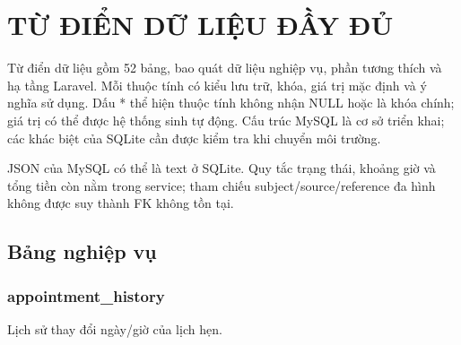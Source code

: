 \appendix\chapter{TỪ ĐIỂN DỮ LIỆU ĐẦY ĐỦ}\label{app:dictionary}
Từ điển dữ liệu gồm 52 bảng, bao quát dữ liệu nghiệp vụ, phần tương thích và hạ tầng Laravel.\allowbreak{} Mỗi thuộc tính có kiểu lưu trữ, khóa, giá trị mặc định và ý nghĩa sử dụng.\allowbreak{} Dấu * thể hiện thuộc tính không nhận NULL hoặc là khóa chính; giá trị có thể được hệ thống sinh tự động.\allowbreak{} Cấu trúc My\allowbreak{}SQL là cơ sở triển khai; các khác biệt của SQLite cần được kiểm tra khi chuyển môi trường.\allowbreak{}

JSON của My\allowbreak{}SQL có thể là text ở SQLite.\allowbreak{} Quy tắc trạng thái, khoảng giờ và tổng tiền còn nằm trong service; tham chiếu subject/\allowbreak{}source/\allowbreak{}reference đa hình không được suy thành FK không tồn tại.\allowbreak{}


\section{Bảng nghiệp vụ}
\begingroup\fontsize{11.5}{14.5}\selectfont
\clearpage

\subsection{appointment\_\allowbreak{}history}
Lịch sử thay đổi ngày/\allowbreak{}giờ của lịch hẹn.\allowbreak{}


